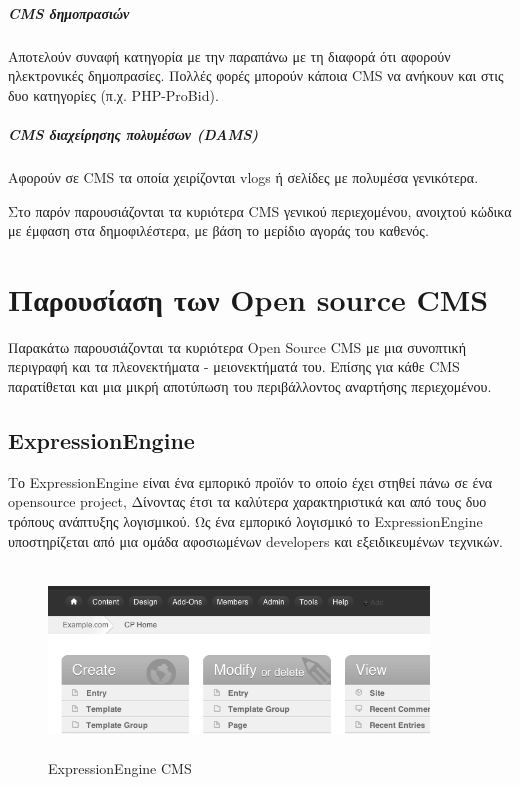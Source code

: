 \documentclass[12pt]{report}
\begin{document}
\paragraph{\textlatin{CMS} δημοπρασιών} Αποτελούν συναφή κατηγορία με την παραπάνω με τη διαφορά ότι αφορούν ηλεκτρονικές δημοπρασίες. Πολλές φορές μπορούν κάποια \textlatin{CMS} να ανήκουν και στις δυο κατηγορίες (π.χ. \textlatin{PHP-ProBid}).

\paragraph{\textlatin{CMS} διαχείρησης πολυμέσων (\textlatin{DAMS})} Αφορούν σε \textlatin{CMS} τα οποία χειρίζονται \textlatin{vlogs} ή σελίδες με πολυμέσα γενικότερα.

Στο παρόν παρουσιάζονται τα κυριότερα \textlatin{CMS} γενικού περιεχομένου, ανοιχτού κώδικα με έμφαση στα δημοφιλέστερα, με βάση το μερίδιο αγοράς του καθενός.

\chapter{Παρουσίαση των \textlatin{Open source CMS}}\label{ch2}
Παρακάτω παρουσιάζονται τα κυριότερα \textlatin{Open Source CMS} με μια συνοπτική περιγραφή και τα πλεονεκτήματα - μειονεκτήματά του. Επίσης για κάθε \textlatin{CMS} παρατίθεται και μια μικρή αποτύπωση του περιβάλλοντος αναρτήσης περιεχομένου.

\section{\textlatin{ExpressionEngine}}
Το \textlatin{ExpressionEngine} είναι ένα εμπορικό προϊόν το οποίο έχει στηθεί πάνω σε ένα \textlatin{opensource project}, Δίνοντας έτσι τα καλύτερα χαρακτηριστικά και από τους δυο τρόπους ανάπτυξης λογισμικού. Ως ένα εμπορικό λογισμικό το \textlatin{ExpressionEngine} υποστηρίζεται από μια ομάδα αφοσιωμένων \textlatin{developers} και εξειδικευμένων τεχνικών.
\begin{figure}[H]
\centering
\includegraphics[width=0.9\textwidth, height=5cm]{ExpressionEngine-gray}
\caption{\textlatin{ExpressionEngine CMS}}
\label{fig:expr_eng}
\end{figure}
\end{document}
